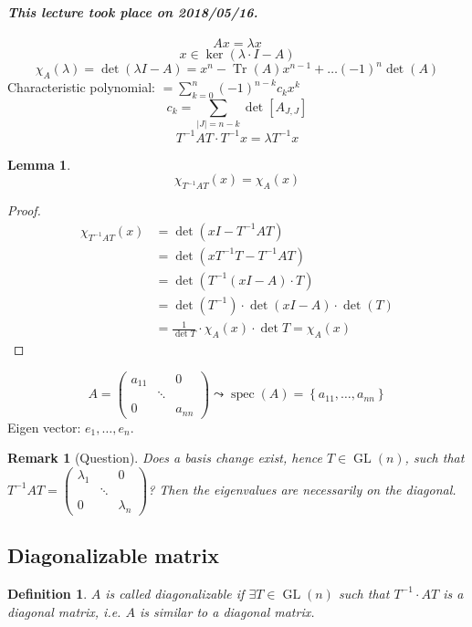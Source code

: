 \documentclass{article}
\newtheorem{definition}{Definition}  \numberwithin{definition}{section}
\newtheorem{lemma}{Lemma}  \numberwithin{lemma}{section}
\newtheorem{remark}{Remark}  \numberwithin{remark}{section}
\newcommand{\set}[1]{\left\{#1\right\}}
\newcommand{\card}[1]{\left|#1\right|}
\newcommand{\dateref}[1]{\paragraph{\textit{This lecture took place on #1.}}}
\begin{document}
\dateref{2018/05/16}

\[ Ax = \lambda x \]
\[ x \in \ker(\lambda \cdot I - A) \]
\[ \chi_A(\lambda) = \det(\lambda I - A) = x^n - \operatorname{Tr}(A) x^{n-1} + \dots (-1)^n \det(A) \]
Characteristic polynomial: $= \sum_{k=0}^n (-1)^{n-k} c_k x^k$
\[ c_k = \sum_{\card{J} = n-k} \det[A_{J,J}] \]
\[ T^{-1} AT \cdot T^{-1} x = \lambda T^{-1} x \]

\begin{lemma} %
  \[ \chi_{T^{-1} AT}(x) = \chi_A(x) \]
\end{lemma}
\begin{proof}
  \begin{align*}
    \chi_{T^{-1}AT}(x) &= \det(xI - T^{-1}AT) \\
      &= \det(x T^{-1} T - T^{-1} AT) \\
      &= \det(T^{-1}(xI - A) \cdot T) \\
      &= \det(T^{-1}) \cdot \det(xI - A) \cdot \det(T) \\
      &= \frac{1}{\det{T}} \cdot \chi_A(x) \cdot \det{T} = \chi_A(x)
  \end{align*}
\end{proof}

\[ A = \begin{pmatrix} a_{11} & & 0 \\ & \ddots & \\ 0 & & a_{nn} \end{pmatrix} \leadsto \operatorname{spec}(A) = \set{a_{11}, \dots, a_{nn}} \]
Eigen vector: $e_1, \dots, e_n$.

\begin{remark}[Question]
  Does a basis change exist, hence $T \in \operatorname{GL}(n)$, such that $T^{-1} AT = \begin{pmatrix} \lambda_1 & & 0 \\ & \ddots & \\ 0 &  & \lambda_n \end{pmatrix}$?
  Then the eigenvalues are necessarily on the diagonal.
\end{remark}

\subsection{Diagonalizable matrix}

\begin{definition} %
  $A$ is called \emph{diagonalizable} if $\exists T \in \operatorname{GL}(n)$ such that $T^{-1} \cdot AT$ is a diagonal matrix,
  i.e. $A$ is \emph{similar} to a diagonal matrix.
\end{definition}
\end{document}
